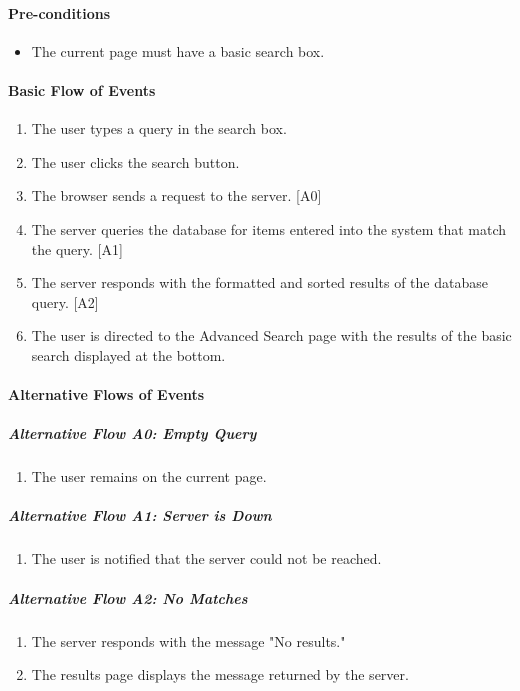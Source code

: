 \documentclass{article}
\begin{document}
\paragraph{Pre-conditions}
\begin{itemize}
\item The current page must have a basic search box.
\end{itemize}

\paragraph{Basic Flow of Events}
\begin{enumerate}
\item The user types a query in the search box.
\item The user clicks the search button.
\item The browser sends a request to the server. [A0]
\item The server queries the database for items entered into the system that match the query. [A1]
\item The server responds with the formatted and sorted results of the database query. [A2]
\item The user is directed to the Advanced Search page with the results of the basic search displayed at the bottom.
\end{enumerate}

\paragraph{Alternative Flows of Events}

\subparagraph{Alternative Flow A0: Empty Query}
\begin{enumerate}
\item The user remains on the current page.
\end{enumerate}

\subparagraph{Alternative Flow A1: Server is Down}
\begin{enumerate}
\item The user is notified that the server could not be reached.
\end{enumerate}

\subparagraph{Alternative Flow A2: No Matches}
\begin{enumerate}
\item The server responds with the message "No results."
\item The results page displays the message returned by the server.
\end{enumerate}
\end{document}
